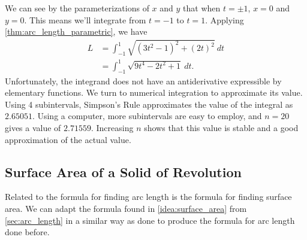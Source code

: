 {We can see by the parameterizations of $x$ and $y$ that when $t=\pm 1$, $x=0$ and $y=0$. This means we'll integrate from $t=-1$ to $t=1$. Applying \autoref{thm:arc_length_parametric}, we have
\begin{align*}
L 	&= \int_{-1}^1\sqrt{(3t^2-1)^2+(2t)^2}\ dt\\
		&=	\int_{-1}^1 \sqrt{9t^4-2t^2+1} \ dt.
\end{align*}
Unfortunately, the integrand does not have an antiderivative expressible by elementary functions. We turn to numerical integration to approximate its value. Using 4 subintervals, Simpson's Rule approximates the value of the integral as $2.65051$. Using a computer, more subintervals are easy to employ, and $n=20$ gives a value of $2.71559$. Increasing $n$ shows that this value is stable and a good approximation of the actual value.}


\subsection{Surface Area of a Solid of Revolution}

Related to the formula for finding arc length is the formula for finding surface area. We can adapt the formula found in \autoref{idea:surface_area} from \autoref{sec:arc_length} in a similar way as done to produce the formula for arc length done before.

